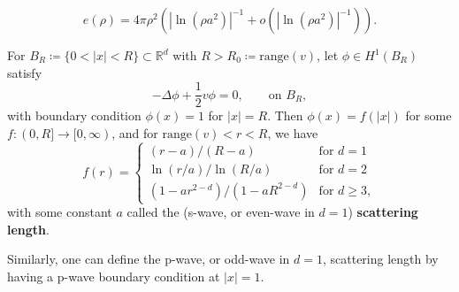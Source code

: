 \documentclass[final]{beamer}
\newcommand{\abs}[1]{\left\lvert #1 \right\rvert}
\newcommand{\R}{\mathbb{R}}
\newlength{\colwidth}
\begin{document}
\begin{frame}[t]
\begin{columns}[t]
\begin{column}{\colwidth}
\begin{tcolorbox}[colframe=qmathblue,colback=qmathbluelyslyslys,title=Set up and previous results]
		\begin{theorem}[$ d=2 $ result, \cite{lieb2001ground}]
			\begin{equation}
			e(\rho)=4\pi \rho^2\left(\abs{\ln(\rho a^2)}^{-1}+o(\abs{\ln(\rho a^2)}^{-1})\right) .
			\end{equation}
		\end{theorem}
		
		
		\end{tcolorbox}\vspace{0.75cm}
		\begin{tcolorbox}[colframe=qmathblue,colback=qmathbluelyslyslys,title=The scattering length]
			\begin{theorem}
				For $ B_R\coloneqq\{0<\abs{x}<R\}\subset \R^d $ with $ R>R_0\coloneqq\text{range}(v) $, let $ \phi\in H^1(B_{R}) $ satisfy
				\begin{equation}
				-\Delta \phi +\frac12 v\phi=0,\qquad \text{on }B_R,
				\end{equation}
				with boundary condition $ \phi(x)=1 $ for $ \abs{x}=R$.
				Then $ \phi(x)=f(\abs{x}) $ for some $ f:(0,R]\to [0,\infty) $, and for $ \text{range}(v)<r<R $, we have \begin{equation}
				f(r)=\begin{cases}
				(r-a)/(R-a) &\text{for }d=1\\
				\ln(r/a)/\ln(R/a) &\text{for }d=2\\
				(1-ar^{2-d})/(1-aR^{2-d})&\text{for }d\geq 3,
				\end{cases}
				\end{equation}
				with some constant $ a $ called the (s-wave, or even-wave in $ d=1 $) \textbf{scattering length}.
			\end{theorem}
			Similarly, one can define the p-wave, or odd-wave in $ d=1 $, scattering length by having a p-wave boundary condition at $ \abs{x}=1 $.
		\end{tcolorbox}\vspace{0.75cm}
			

\end{column}
\end{columns}
\end{frame}
\end{document}
